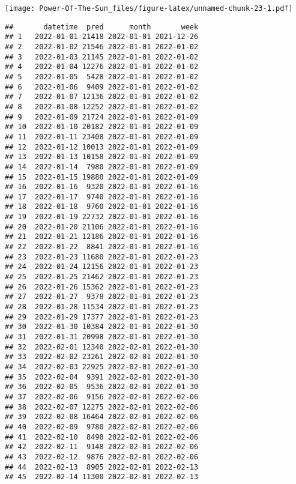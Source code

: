 \documentclass[
]{article}
\newenvironment{Shaded}{\begin{snugshade}}{\end{snugshade}}
\newcommand{\NormalTok}[1]{#1}
\newcommand{\SpecialCharTok}[1]{\textcolor[rgb]{0.81,0.36,0.00}{\textbf{#1}}}
\begin{document}
\texttt{[image: Power-Of-The-Sun\_files/figure-latex/unnamed-chunk-23-1.pdf]}

\begin{Shaded}
\end{Shaded}

\begin{verbatim}
##       datetime  pred      month       week
## 1   2022-01-01 21418 2022-01-01 2021-12-26
## 2   2022-01-02 21546 2022-01-01 2022-01-02
## 3   2022-01-03 21145 2022-01-01 2022-01-02
## 4   2022-01-04 12276 2022-01-01 2022-01-02
## 5   2022-01-05  5428 2022-01-01 2022-01-02
## 6   2022-01-06  9409 2022-01-01 2022-01-02
## 7   2022-01-07 12136 2022-01-01 2022-01-02
## 8   2022-01-08 12252 2022-01-01 2022-01-02
## 9   2022-01-09 21724 2022-01-01 2022-01-09
## 10  2022-01-10 20182 2022-01-01 2022-01-09
## 11  2022-01-11 23408 2022-01-01 2022-01-09
## 12  2022-01-12 10013 2022-01-01 2022-01-09
## 13  2022-01-13 10158 2022-01-01 2022-01-09
## 14  2022-01-14  7980 2022-01-01 2022-01-09
## 15  2022-01-15 19880 2022-01-01 2022-01-09
## 16  2022-01-16  9320 2022-01-01 2022-01-16
## 17  2022-01-17  9740 2022-01-01 2022-01-16
## 18  2022-01-18  9760 2022-01-01 2022-01-16
## 19  2022-01-19 22732 2022-01-01 2022-01-16
## 20  2022-01-20 21106 2022-01-01 2022-01-16
## 21  2022-01-21 12186 2022-01-01 2022-01-16
## 22  2022-01-22  8841 2022-01-01 2022-01-16
## 23  2022-01-23 11680 2022-01-01 2022-01-23
## 24  2022-01-24 12156 2022-01-01 2022-01-23
## 25  2022-01-25 21462 2022-01-01 2022-01-23
## 26  2022-01-26 15362 2022-01-01 2022-01-23
## 27  2022-01-27  9378 2022-01-01 2022-01-23
## 28  2022-01-28 11534 2022-01-01 2022-01-23
## 29  2022-01-29 17377 2022-01-01 2022-01-23
## 30  2022-01-30 10384 2022-01-01 2022-01-30
## 31  2022-01-31 20998 2022-01-01 2022-01-30
## 32  2022-02-01 12340 2022-02-01 2022-01-30
## 33  2022-02-02 23261 2022-02-01 2022-01-30
## 34  2022-02-03 22925 2022-02-01 2022-01-30
## 35  2022-02-04  9391 2022-02-01 2022-01-30
## 36  2022-02-05  9536 2022-02-01 2022-01-30
## 37  2022-02-06  9156 2022-02-01 2022-02-06
## 38  2022-02-07 12275 2022-02-01 2022-02-06
## 39  2022-02-08 16464 2022-02-01 2022-02-06
## 40  2022-02-09  9780 2022-02-01 2022-02-06
## 41  2022-02-10  8498 2022-02-01 2022-02-06
## 42  2022-02-11  9148 2022-02-01 2022-02-06
## 43  2022-02-12  9876 2022-02-01 2022-02-06
## 44  2022-02-13  8905 2022-02-01 2022-02-13
## 45  2022-02-14 11300 2022-02-01 2022-02-13

\end{verbatim}
\end{document}

